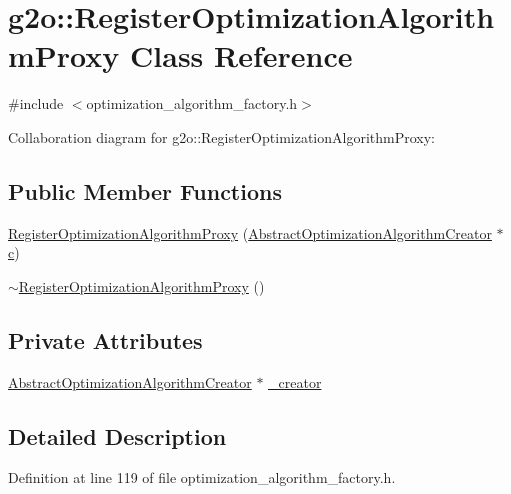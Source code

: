 \hypertarget{classg2o_1_1RegisterOptimizationAlgorithmProxy}{}\section{g2o\+:\+:Register\+Optimization\+Algorithm\+Proxy Class Reference}
\label{classg2o_1_1RegisterOptimizationAlgorithmProxy}


{\ttfamily \#include $<$optimization\+\_\+algorithm\+\_\+factory.\+h$>$}



Collaboration diagram for g2o\+:\+:Register\+Optimization\+Algorithm\+Proxy\+:
\subsection*{Public Member Functions}
\begin{DoxyCompactItemize}
\item 
\hyperlink{classg2o_1_1RegisterOptimizationAlgorithmProxy_acf89c65d6156d53014e0dcafd388258c}{Register\+Optimization\+Algorithm\+Proxy} (\hyperlink{classg2o_1_1AbstractOptimizationAlgorithmCreator}{Abstract\+Optimization\+Algorithm\+Creator} $\ast$\hyperlink{sparse__helper_8cpp_a4e1e0e72dd773439e333c84dd762a9c3}{c})
\item 
\hyperlink{classg2o_1_1RegisterOptimizationAlgorithmProxy_a30f84a170a0d140ee60e1bc428d4c65f}{$\sim$\+Register\+Optimization\+Algorithm\+Proxy} ()
\end{DoxyCompactItemize}
\subsection*{Private Attributes}
\begin{DoxyCompactItemize}
\item 
\hyperlink{classg2o_1_1AbstractOptimizationAlgorithmCreator}{Abstract\+Optimization\+Algorithm\+Creator} $\ast$ \hyperlink{classg2o_1_1RegisterOptimizationAlgorithmProxy_a75e4119a0fdcfe4c4267cd86a90073d6}{\+\_\+creator}
\end{DoxyCompactItemize}


\subsection{Detailed Description}


Definition at line 119 of file optimization\+\_\+algorithm\+\_\+factory.\+h.



